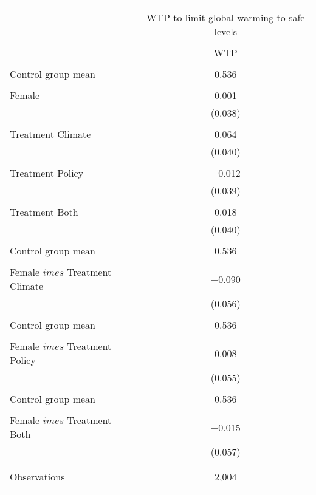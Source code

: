
\begin{tabular}{@{\extracolsep{5pt}}lc} 
\\[-1.8ex]\hline 
\hline \\[-1.8ex] 
 & \multicolumn{1}{c}{WTP to limit global warming to safe levels} \\ 
\cline{2-2} 
\\[-1.8ex] & WTP \\ 
\hline \\[-1.8ex] 
 Control group mean & 0.536  \\ \hline \\[-1.8ex] Female & 0.001 \\ 
  & (0.038) \\ 
  & \\ 
 Treatment Climate & 0.064 \\ 
  & (0.040) \\ 
  & \\ 
 Treatment Policy & $-$0.012 \\ 
  & (0.039) \\ 
  & \\ 
 Treatment Both & 0.018 \\ 
  & (0.040) \\ 
  & \\ 
 Control group mean & 0.536  \\ \hline \\[-1.8ex] Female $	imes$ Treatment Climate & $-$0.090 \\ 
  & (0.056) \\ 
  & \\ 
 Control group mean & 0.536  \\ \hline \\[-1.8ex] Female $	imes$ Treatment Policy & 0.008 \\ 
  & (0.055) \\ 
  & \\ 
 Control group mean & 0.536  \\ \hline \\[-1.8ex] Female $	imes$ Treatment Both & $-$0.015 \\ 
  & (0.057) \\ 
  & \\ 
\hline \\[-1.8ex] 

Observations & 2,004 \\ 
\hline 
\hline \\[-1.8ex] 
\end{tabular} 